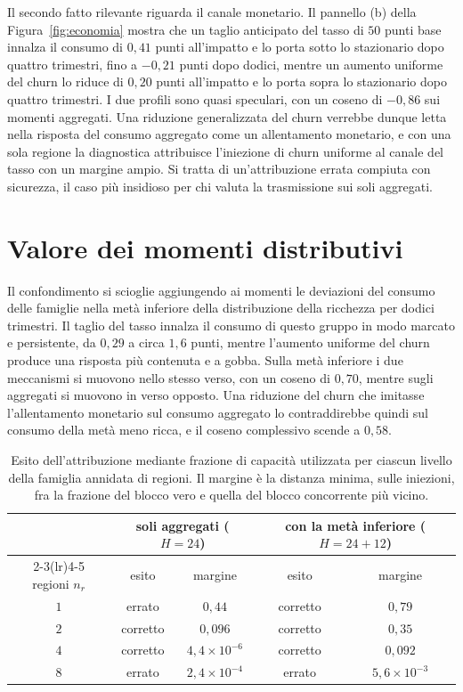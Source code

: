 \documentclass[11pt,a4paper]{article}
\begin{document}
Il secondo fatto rilevante riguarda il canale monetario. Il pannello (b) della Figura~\ref{fig:economia} mostra che un taglio anticipato del tasso di $50$ punti base innalza il consumo di $0{,}41$ punti all'impatto e lo porta sotto lo stazionario dopo quattro trimestri, fino a $-0{,}21$ punti dopo dodici, mentre un aumento uniforme del churn lo riduce di $0{,}20$ punti all'impatto e lo porta sopra lo stazionario dopo quattro trimestri. I due profili sono quasi speculari, con un coseno di $-0{,}86$ sui momenti aggregati. Una riduzione generalizzata del churn verrebbe dunque letta nella risposta del consumo aggregato come un allentamento monetario, e con una sola regione la diagnostica attribuisce l'iniezione di churn uniforme al canale del tasso con un margine ampio. Si tratta di un'attribuzione errata compiuta con sicurezza, il caso più insidioso per chi valuta la trasmissione sui soli aggregati.

\section{Valore dei momenti distributivi}\label{sec:distributivi}
Il confondimento si scioglie aggiungendo ai momenti le deviazioni del consumo delle famiglie nella metà inferiore della distribuzione della ricchezza per dodici trimestri. Il taglio del tasso innalza il consumo di questo gruppo in modo marcato e persistente, da $0{,}29$ a circa $1{,}6$ punti, mentre l'aumento uniforme del churn produce una risposta più contenuta e a gobba. Sulla metà inferiore i due meccanismi si muovono nello stesso verso, con un coseno di $0{,}70$, mentre sugli aggregati si muovono in verso opposto. Una riduzione del churn che imitasse l'allentamento monetario sul consumo aggregato lo contraddirebbe quindi sul consumo della metà meno ricca, e il coseno complessivo scende a $0{,}58$.

\begin{table}[t]
\centering\small
\caption{Esito dell'attribuzione mediante frazione di capacità utilizzata per ciascun livello della famiglia annidata di regioni. Il margine è la distanza minima, sulle iniezioni, fra la frazione del blocco vero e quella del blocco concorrente più vicino.}
\label{tab:risoluzione}
\begin{tabular}{ccccc}
\toprule
 & \multicolumn{2}{c}{soli aggregati ($H=24$)} & \multicolumn{2}{c}{con la metà inferiore ($H=24+12$)}\\
\cmidrule(lr){2-3}\cmidrule(lr){4-5}
regioni $n_r$ & esito & margine & esito & margine\\
\midrule
$1$ & errato & $0{,}44$ & corretto & $0{,}79$\\
$2$ & corretto & $0{,}096$ & corretto & $0{,}35$\\
$4$ & corretto & $4{,}4\times10^{-6}$ & corretto & $0{,}092$\\
$8$ & errato & $2{,}4\times10^{-4}$ & errato & $5{,}6\times10^{-3}$\\
\bottomrule
\end{tabular}
\end{table}
\end{document}
